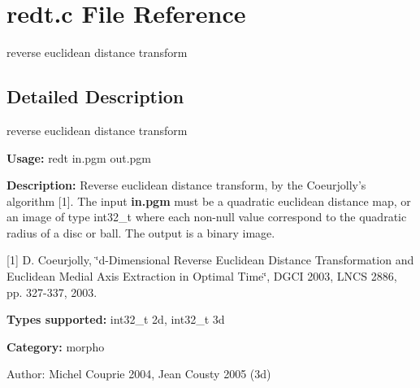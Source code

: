 \section{redt.c File Reference}
\label{redt_8c}
reverse euclidean distance transform 



\subsection{Detailed Description}
reverse euclidean distance transform 

{\bf Usage:} redt in.pgm out.pgm

{\bf Description:} Reverse euclidean distance transform, by the Coeurjolly's algorithm [1]. The input {\bf in.pgm} must be a quadratic euclidean distance map, or an image of type int32\_\-t where each non-null value correspond to the quadratic radius of a disc or ball. The output is a binary image.

[1] D. Coeurjolly, \char`\"{}d-Dimensional Reverse Euclidean Distance Transformation and Euclidean Medial Axis Extraction in Optimal Time\char`\"{}, DGCI 2003, LNCS 2886, pp. 327-337, 2003.

{\bf Types supported:} int32\_\-t 2d, int32\_\-t 3d

{\bf Category:} morpho

\begin{Desc}
\item[Author:]Michel Couprie 2004, Jean Cousty 2005 (3d) \end{Desc}

